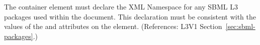 The  container element must declare the XML Namespace
for any SBML L3 packages used within the document.  This 
declaration must be consistent with the values
of the  and  attributes on the 
 element.  (References: 
L3V1 Section~\ref{sec:sbml-packages}.)
